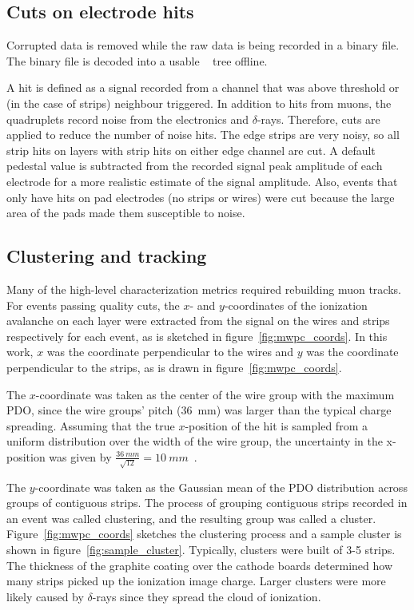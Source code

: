 \subsection{Cuts on electrode hits}
Corrupted data is removed while the raw data is being recorded in a binary file. The binary file is decoded into a usable ~\cite{ROOT_paper} tree offline. 

A hit is defined as a signal recorded from a channel that was above threshold or (in the case of strips) neighbour triggered. In addition to hits from muons, the quadruplets record noise from the electronics and $\delta$-rays. Therefore, cuts are applied to reduce the number of noise hits. The edge strips are very noisy, so all strip hits on layers with strip hits on either edge channel are cut. A default pedestal value is subtracted from the recorded signal peak amplitude of each electrode for a more realistic estimate of the signal amplitude. Also, events that only have hits on pad electrodes (no strips or wires) were cut because the large area of the pads made them susceptible to noise.

\subsection{Clustering and tracking}
Many of the high-level characterization metrics required rebuilding muon tracks. For events passing quality cuts, the $x$- and $y$-coordinates of the ionization avalanche on each layer were extracted from the signal on the wires and strips respectively for each event, as is sketched in figure~\ref{fig:mwpc_coords}. In this work, $x$ was the coordinate perpendicular to the wires and $y$ was the coordinate perpendicular to the strips, as is drawn in figure~\ref{fig:mwpc_coords}.

The $x$-coordinate was taken as the center of the wire group with the maximum PDO, since the wire groups' pitch (\SI{36}{\milli\meter}) was larger than the typical charge spreading. Assuming that the true $x$-position of the hit is sampled from a uniform distribution over the width of the wire group, the uncertainty in the x-position was given by $\frac{36~mm}{\sqrt{12}} = 10~mm$~\cite{Sauli:117989}.

The $y$-coordinate was taken as the Gaussian mean of the PDO distribution across groups of contiguous strips. The process of grouping contiguous strips recorded in an event was called clustering, and the resulting group was called a cluster. Figure~\ref{fig:mwpc_coords} sketches the clustering process and a sample cluster is shown in figure~\ref{fig:sample_cluster}. Typically, clusters were built of 3-5 strips. The thickness of the graphite coating over the cathode boards determined how many strips picked up the ionization image charge. Larger clusters were more likely caused by $\delta$-rays since they spread the cloud of ionization. 

